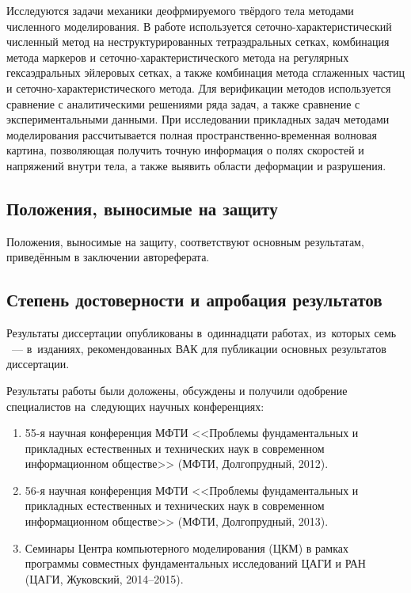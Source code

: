 \documentclass[a4paper,14pt]{extarticle}
\numberwithin{equation}{section}
\begin{document}
    Исследуются задачи механики деофрмируемого твёрдого тела методами численного моделирования. В работе используется
    сеточно-ха\-рак\-те\-рис\-ти\-чес\-кий численный метод на неструктурированных тетраэдральных сетках, комбинация метода маркеров
    и сеточно-характеристического метода  на регулярных гексаэдральных эйлеровых сетках, а также комбинация метода
    сглаженных частиц и сеточно-характеристического метода. Для верификации методов используется сравнение с
    аналитическими решениями ряда задач, а также сравнение с экспериментальными данными. При исследовании прикладных
    задач методами моделирования рассчитывается полная пространственно-временная волновая картина, позволяющая получить
    точную информация о полях скоростей и напряжений внутри тела, а также выявить области деформации и разрушения.

    \subsection*{Положения, выносимые на защиту}
    Положения, выносимые на защиту, соответствуют основным результатам, приведённым в заключении автореферата.

    \subsection*{Степень достоверности и апробация результатов}

    Результаты диссертации опубликованы в~одиннадцати работах, из~которых семь
    \cite{беклемышева2013численное,васюков2014комбинирование,петров2014схм,petrov2014combined,петров2014численный,петров2015комбинированный,беклемышева2014численное}~---
    в~изданиях, рекомендованных ВАК для публикации основных результатов диссертации.

    Результаты работы были доложены, обсуждены и получили одобрение специалистов на~следующих научных конференциях:

    \begin{enumerate}
        \item 55-я научная конференция МФТИ <<Проблемы фундаментальных и прикладных естественных и технических наук в
              современном информационном обществе>> (МФТИ, Долгопрудный, 2012).
        \item 56-я научная конференция МФТИ <<Проблемы фундаментальных и прикладных естественных и технических наук в
              современном информационном обществе>> (МФТИ, Долгопрудный, 2013).
        \item Семинары Центра компьютерного моделирования (ЦКМ) в рамках программы совместных фундаментальных исследований
              ЦАГИ и РАН (ЦАГИ, Жуковский, 2014--2015).
    \end{enumerate}
\end{document}
